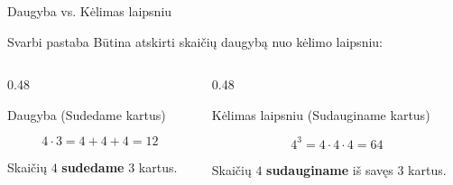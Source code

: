 \documentclass[aspectratio=169,10pt]{beamer}
\begin{document}
\begin{frame}{Daugyba vs. Kėlimas laipsniu}

    \begin{alertblock}{Svarbi pastaba}
        Būtina atskirti skaičių daugybą nuo kėlimo laipsniu:
    \end{alertblock}

    \vspace{0.3cm}

    \begin{columns}[T]

        \begin{column}{0.48\textwidth}

            \begin{block}{Daugyba (Sudedame kartus)}

                \[
                4\cdot3=4+4+4=12
                \]

                Skaičių $4$ \textbf{sudedame} $3$ kartus.

            \end{block}

        \end{column}

        \begin{column}{0.48\textwidth}

            \begin{block}{Kėlimas laipsniu (Sudauginame kartus)}

                \[
                4^3=4\cdot4\cdot4=64
                \]

                Skaičių $4$ \textbf{sudauginame} iš savęs $3$ kartus.

            \end{block}

        \end{column}

    \end{columns}

\end{frame}
\end{document}

